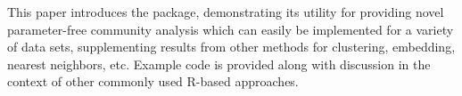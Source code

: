 This paper introduces the  package, demonstrating its
utility for providing novel parameter-free community analysis which can
easily be implemented for a variety of data sets, supplementing results
from other methods for clustering, embedding, nearest neighbors, etc.
Example code is provided along with discussion in the context of other
commonly used R-based approaches.




\address{%
Lucy D'Agostino McGowan\\
Wake Forest University\\%
Winston-Salem, NC\\ 27106\\
%
%
%
\href{mailto:mcgowald@wfu.edu}{\nolinkurl{mcgowald@wfu.edu}}%
}

\address{%
Katherine Moore\\
Amherst College\\%
Amherst, MA\\ 1002\\
%
%
%
\href{mailto:kmoore@amherst.edu}{\nolinkurl{kmoore@amherst.edu}}%
}

\address{%
Kenneth Berenhaut\\
Wake Forest University\\%
Winston-Salem, NC\\ 27106\\
%
%
%
\href{mailto:berenhks@wfu.edu}{\nolinkurl{berenhks@wfu.edu}}%
}
